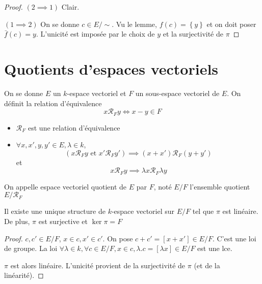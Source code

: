 \begin{proof}
    $(2 \implies 1)$ Clair.

    $(1 \implies  2)$ On se donne $c \in  E / \sim$. Vu le lemme, $f(c)= \left\{ y \right\} $ et on doit poser $\bar f(c)=y$. L'unicité est imposée par le choix de $y$ et la surjectivité de  $\pi$
\end{proof}

\section{Quotients d'espaces vectoriels}

\begin{dfn}
On se donne $E$ un  $k$-espace vectoriel et $F$ un sous-espace vectoriel de  $E$. On définit la relation d'équivalence \[
x \mathcal  R_F y \iff  x-y \in  F
\] 
\end{dfn}

\begin{prop}
\begin{itemize}
    \item $\mathcal  R_F$ est une relation d'équivalence
    \item $\forall  x, x', y, y' \in E, \lambda \in  k$, \[
            (x \mathcal R_F y \text{ et }x'\mathcal R_Fy' )\implies (x+x')\mathcal  R_F(y+y')
    \] 
    et \[
        x\mathcal R_F y \implies \lambda x \mathcal  R_F \lambda y
    \] 
\end{itemize}
\end{prop}

\begin{dfn}
    On appelle espace vectoriel quotient de $E$ par  $F$, noté  $E / F$ l'ensemble quotient $E / \mathcal R_F$
\end{dfn}

\begin{prop}
Il existe une unique structure de $k$-espace vectoriel sur $E / F$ tel que  $ \pi$ est linéaire. De plus, $\pi$ est surjective et $\ker \pi = F$
\end{prop}

\begin{proof}
    $c, c' \in  E / F$, $x \in c, x' \in  c'$. On pose $c+c'=[x+x'] \in  E / F$. C'est une loi de groupe. La loi $\forall  \lambda \in  k, \forall  c \in  E / F, x \in  c, \lambda.c=[\lambda x] \in  E / F$ est une lce.

    $\pi$ est alors linéaire. L'unicité provient de la surjectivité de $ \pi$ (et de la linéarité).
\end{proof}

